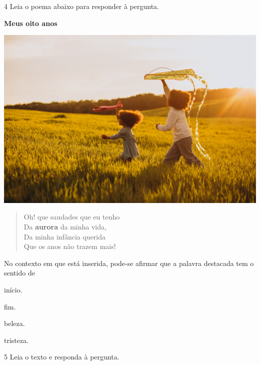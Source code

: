 \num{4} Leia o poema abaixo para responder à pergunta.

\begin{myquote}
\textbf{Meus oito anos}

\begin{center}
\includegraphics[width=.8\textwidth]{media/image47.jpg}
\end{center}

\begin{verse}
Oh! que saudades que eu tenho\\
Da \textbf{aurora} da minha vida,\\
Da minha infância querida\\
Que os anos não trazem mais! 
\end{verse}

\end{myquote}

No contexto em que está inserida, pode-se afirmar que a palavra destacada
tem o sentido de

\begin{multicols}{2}
\begin{escolha}
  \item início.
  \item fim.
  \item beleza.
  \item tristeza.
\end{escolha} 
\end{multicols}

\num{5} Leia o texto e responda à pergunta.

